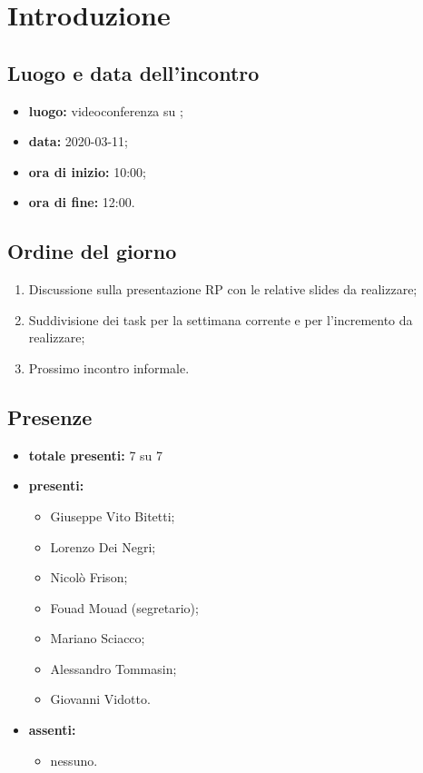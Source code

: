 \section*{Introduzione}

\subsection*{Luogo e data dell'incontro}
	\begin{itemize}
		\item \textbf{luogo:} videoconferenza su ;
		\item \textbf{data:} 2020-03-11;
		\item \textbf{ora di inizio:} 10:00;
		\item \textbf{ora di fine:} 12:00.
	\end{itemize}

\subsection*{Ordine del giorno}
	\begin{enumerate}
			\item Discussione sulla presentazione RP con le relative slides da realizzare;
			\item Suddivisione dei task per la settimana corrente e per l'incremento da realizzare;
			\item Prossimo incontro informale.
	\end{enumerate}

\subsection*{Presenze}
	\begin{itemize}
		\item \textbf{totale presenti:} 7 su 7
		\item \textbf{presenti: }
			\begin{itemize}
				\item Giuseppe Vito Bitetti;
				\item Lorenzo Dei Negri;
				\item Nicolò Frison;
				\item Fouad Mouad (segretario);
				\item Mariano Sciacco;
				\item Alessandro Tommasin;
				\item Giovanni Vidotto.
			\end{itemize}
		\item \textbf{assenti: }
			\begin{itemize}
				\item nessuno.
			\end{itemize}
	\end{itemize}


